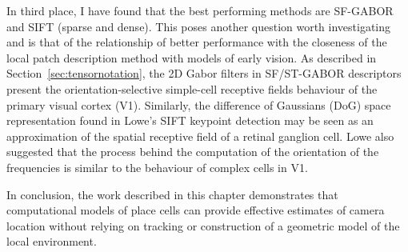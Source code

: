 In third place, I have found that the best performing methods are SF-GABOR and SIFT (sparse and dense). This poses another question worth investigating and is that of the relationship of better performance with the closeness of the local patch description method with models of early vision. As described in Section~\ref{sec:tensornotation}, the 2D Gabor filters in SF/ST-GABOR descriptors present the orientation-selective simple-cell receptive fields behaviour of the primary visual cortex (V1). Similarly, the difference of Gaussians (DoG) space representation found in Lowe's SIFT keypoint detection may be seen as an approximation of the spatial receptive field of a retinal ganglion cell. Lowe also suggested that the process behind the computation of the orientation of the frequencies is similar to the behaviour of complex cells in V1.


In conclusion, the work described in this chapter demonstrates that computational models of place cells can provide effective estimates of camera location without relying on tracking or construction of a geometric model of the local environment. 



